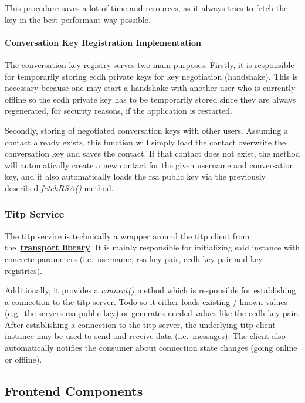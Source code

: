 This procedure saves a lot of time and resources, as it always tries to fetch the key in the best performant way
possible.

\paragraph{Conversation Key Registration Implementation}
The conversation key registry serves two main purposes.
Firstly, it is responsible for temporarily storing \ac{ecdh} private keys for key negotiation (handshake).
This is necessary because one may start a handshake with another user who is currently offline so the \ac{ecdh} private
key has to be temporarily stored since they are always regenerated, for security reasons, if the application is
restarted.

Secondly, storing of negotiated conversation keys with other users.
Assuming a contact already exists, this function will simply load the contact overwrite the conversation key and saves
the contact.
If that contact does not exist, the method will automatically create a new contact for the given username and
conversation key, and it also automatically loads the \ac{rsa} public key via the previously described
\textit{fetchRSA()} method.

\subsubsection{Titp Service}

The \ac{titp} service is technically a wrapper around the \ac{titp} client from
the~\hyperref[subsec:transport]{\textbf{transport library}}.
It is mainly responsible for initializing said instance with concrete parameters (i.e.\ username, \ac{rsa} key pair,
\ac{ecdh} key pair and key registries).

Additionally, it provides a \textit{connect()} method which is responsible for establishing a connection to the
\ac{titp} server.
Todo so it either loads existing / known values (e.g.\ the servers \ac{rsa} public key) or generates needed values like
the \ac{ecdh} key pair.
After establishing a connection to the \ac{titp} server, the underlying \ac{titp} client instance may be used to send
and receive data (i.e.\ messages).
The client also automatically notifies the consumer about connection state changes (going online or offline).

\subsection{Frontend Components}\label{subsec:components}

